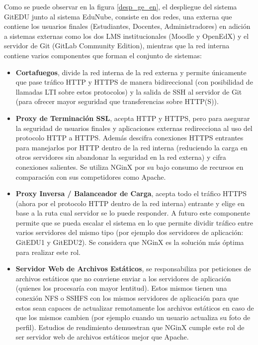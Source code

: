 Como se puede observar en la figura \ref{desp_ge_en}, el despliegue del sistema GitEDU junto al sistema EduNube, consiste en dos redes, una externa que contiene los usuarios finales (Estudiantes, Docentes, Administradores) en adición a sistemas externas como los dos LMS  institucionales (Moodle y OpenEdX) y el servidor de Git (GitLab Community Edition), mientras que la red interna contiene varios componentes que forman el conjunto de sistemas:
\begin{itemize}
	\item \textbf{Cortafuegos}, divide la red interna de la red externa y permite únicamente que pase tráfico HTTP y HTTPS de manera bidireccional (con posibilidad de llamadas LTI  sobre estos protocolos) y la salida de SSH al servidor de Git (para ofrecer mayor seguridad que transferencias sobre HTTP(S)).
    \item \textbf{Proxy de Terminación SSL}, acepta HTTP y HTTPS, pero para asegurar la seguridad de usuarios finales y aplicaciones externas redirecciona al uso del protocolo HTTP a HTTPS. Además descifra conexiones HTTPS entrantes para manejarlos por HTTP dentro de la red interna (reduciendo la carga en otros servidores sin abandonar la seguridad en la red externa) y cifra conexiones salientes. Se utiliza NGinX por su bajo consumo de recursos en comparación con sus competidores como Apache.
    \item \textbf{Proxy Inversa / Balanceador de Carga}, acepta todo el tráfico HTTPS (ahora por el protocolo HTTP dentro de la red interna) entrante y elige en base a la ruta cual servidor se lo puede responder. A futuro este componente permite que se pueda escalar el sistema en lo que permite dividir tráfico entre varios servidores del mismo tipo (por ejemplo dos servidores de aplicación: GitEDU1 y GitEDU2). Se considera que NGinX es la solución más óptima para realizar este rol.
    \item \textbf{Servidor Web de Archivos Estáticos}, se responsabiliza por peticiones de archivos estáticos que no conviene enviar a los servidores de aplicación (quienes los procesaría con mayor lentitud). Estos mismos tienen una conexión NFS o SSHFS con los mismos servidores de aplicación para que estos sean capaces de actualizar remotamente los archivos estáticos en caso de que los mismos cambien (por ejemplo cuando un usuario actualiza su foto de perfil). Estudios de rendimiento demuestran que NGinX cumple este rol de ser servidor web de archivos estáticos mejor que Apache.
     

\end{itemize}
